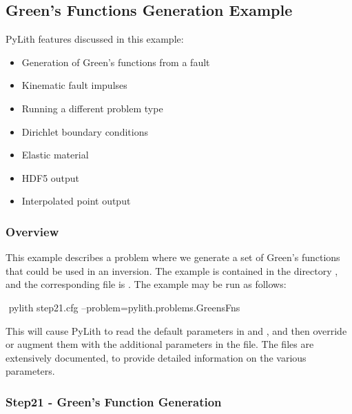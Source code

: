 \subsection{Green's Functions Generation Example}
\label{sec:example:3dhex8:greensfns}

PyLith features discussed in this example:
\begin{itemize}
\item Generation of Green's functions from a fault
\item Kinematic fault impulses
\item Running a different problem type
\item Dirichlet boundary conditions
\item Elastic material
\item HDF5 output
\item Interpolated point output
\end{itemize}

\subsubsection{Overview}

This example describes a problem where we generate a set of Green's
functions that could be used in an inversion. The example is contained
in the directory , and the corresponding
 file is . The example may be run
as follows:
\begin{shell}
$$ pylith step21.cfg --problem=pylith.problems.GreensFns
\end{shell}
This will cause PyLith to read the default parameters in
 and , and then
override or augment them with the additional parameters in the
 file. The  files are extensively
documented, to provide detailed information on the various parameters.


\subsubsection{Step21 - Green's Function Generation}

